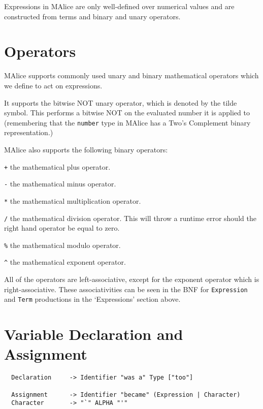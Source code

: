 \documentclass[a4wide, 11pt]{article}
\begin{document}
Expressions in MAlice are only well-defined over numerical values and are constructed from terms and binary and unary operators.

\section{Operators}

MAlice supports commonly used unary and binary mathematical operators which we define to act on expressions.

It supports the bitwise NOT unary operator, which is denoted by the tilde symbol. This performs a bitwise NOT on the evaluated number it is applied to (remembering that the \texttt{number} type in MAlice has a Two's Complement binary representation.)

MAlice also supports the following binary operators:

\begin{list}{} {
\setlength{\labelsep}{0.75cm}
\setlength{\leftmargin}{2cm}
}

\item[\texttt{+}] the mathematical plus operator.
\item[\texttt{-}] the mathematical minus operator.
\item[\texttt{*}] the mathematical multiplication operator.
\item[\texttt{/}] the mathematical division operator. This will throw a runtime error should the right hand operator be equal to zero.
\item[\texttt{\%}] the mathematical modulo operator.
\item[\texttt{\^}] the mathematical exponent operator.

\end{list}

All of the operators are left-associative, except for the exponent operator which is right-associative. These associativities can be seen in the BNF for \texttt{Expression} and \texttt{Term} productions in the `Expressions' section above.

\section{Variable Declaration and Assignment}

\begin{verbatim}
  Declaration     -> Identifier "was a" Type ["too"]
  
  Assignment      -> Identifier "became" (Expression | Character)
  Character       -> "`" ALPHA "'"
\end{verbatim}
\end{document}
